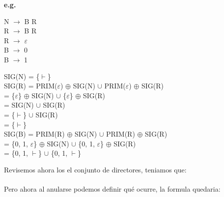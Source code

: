 \documentclass[\main/ApuntesPL.tex]{subfiles}
\begin{document}
    \newpage
    \par
    \textbf{e.g.}
    \begin{center}
      \begin{minipage}{.3\textwidth}
        \hspace*{5mm}N $\rightarrow$ B R\\
        \hspace*{5mm}R $\rightarrow$ B R\\
        \hspace*{5mm}R $\rightarrow$ $\varepsilon$\\
        \hspace*{5mm}B $\rightarrow$ 0\\
        \hspace*{5mm}B $\rightarrow$ 1
      \end{minipage}%
      \begin{minipage}{.65\textwidth}
        \hspace*{5mm}SIG(N) = \{$\vdash$\}\\
        \hspace*{5mm}SIG(R) = PRIM($\varepsilon$) $\oplus$ SIG(N) $\cup$ PRIM($\varepsilon$)
          $\oplus$ SIG(R)\\
        \hspace*{19mm}= \{$\varepsilon$\} $\oplus$ SIG(N) $\cup$ \{$\varepsilon$\} $\oplus$
          SIG(R)\\
        \hspace*{19mm}= SIG(N) $\cup$ SIG(R)\\
        \hspace*{19mm}= \{$\vdash$\} $\cup$ SIG(R)\\
        \hspace*{19mm}= \{$\vdash$\}\\
        \hspace*{5mm}SIG(B) = PRIM(R) $\oplus$ SIG(N) $\cup$ PRIM(R) $\oplus$ SIG(R)\\
        \hspace*{19mm}= \{0, 1, $\varepsilon$\} $\oplus$ SIG(N) $\cup$ \{0, 1, $\varepsilon$\}
          $\oplus$ SIG(R)\\
        \hspace*{19mm}= \{0, 1, $\vdash$\} $\cup$ \{0, 1, $\vdash$\}
      \end{minipage}
    \end{center}

    \bigskip
    \par
    Revisemos ahora los el conjunto de directores, teniamos que:\\
    \\
    Pero ahora al anularse podemos definir qué ocurre, la formula quedaria:\\
    \hspace{10mm}{\large DIR(A $\rightarrow$ $\alpha$) = PRIM($\alpha$) $\oplus$ SIG(A)}
\end{document}
